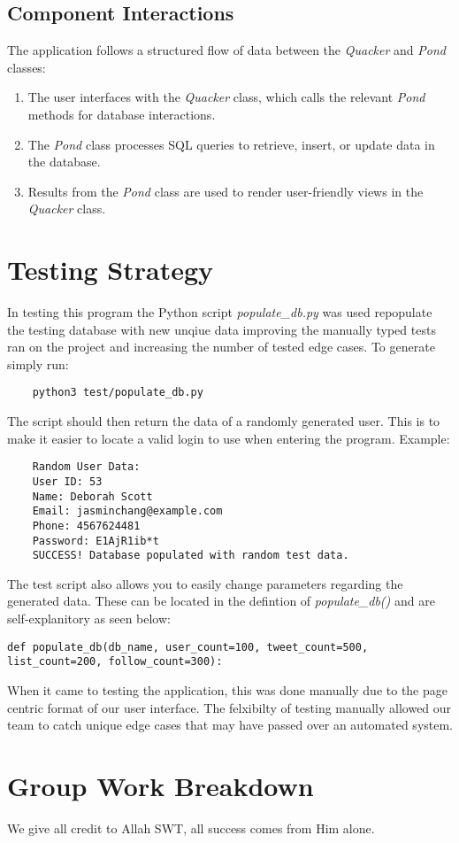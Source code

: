 \documentclass[11pt]{article}
\begin{document}
	\subsection*{Component Interactions}
	The application follows a structured flow of data between the \textit{Quacker} and \textit{Pond} classes:
	\begin{enumerate}
		\item The user interfaces with the \textit{Quacker} class, which calls the relevant \textit{Pond} methods for database interactions.
		\item The \textit{Pond} class processes SQL queries to retrieve, insert, or update data in the database.
		\item Results from the \textit{Pond} class are used to render user-friendly views in the \textit{Quacker} class.
	\end{enumerate}


\section{Testing Strategy}
In testing this program the Python script \textit{populate\_db.py} was used repopulate the testing database with 
new unqiue data improving the manually typed tests ran on the project and increasing the number of tested edge 
cases. To generate simply run:
\begin{verbatim}
	python3 test/populate_db.py
\end{verbatim}
The script should then return the data of a randomly generated user. This is to make it easier to locate a valid
login to use when entering the program. Example: 
\begin{verbatim}
	Random User Data:
	User ID: 53
	Name: Deborah Scott
	Email: jasminchang@example.com
	Phone: 4567624481
	Password: E1AjR1ib*t
	SUCCESS! Database populated with random test data.
\end{verbatim}
The test script also allows you to easily change parameters regarding the generated data. These can be located in the
defintion of \textit{populate\_db()} and are self-explanitory as seen below:
\begin{lstlisting}
def populate_db(db_name, user_count=100, tweet_count=500, list_count=200, follow_count=300):
\end{lstlisting}
When it came to testing the application, this was done manually due to the page centric format of our user interface. 
The felxibilty of testing manually allowed our team to catch unique edge cases that may have passed over an automated
system.


\section{Group Work Breakdown}
We give all credit to Allah SWT, all success comes from Him alone.
\end{document}
